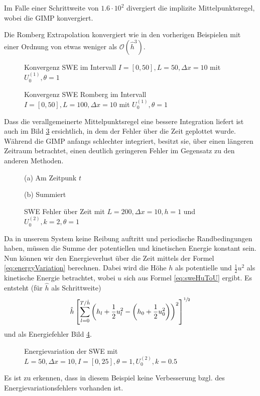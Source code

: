 Im Falle einer Schrittweite von $1.6\cdot 10^2$ divergiert die implizite Mittelpunktsregel, wobei die GIMP konvergiert. 

Die Romberg Extrapolation konvergiert wie in den vorherigen Beispielen mit einer Ordnung von etwas weniger als $\mathcal O(\hat h^3)$. 

\begin{figure}
\centering

\caption{Konvergenz SWE im Intervall $I = [0,50], L=50, \Delta x=10$ mit $U_0^{(1)},\theta=1$}
\label{fig:sweConvergence}
\end{figure}

\begin{figure}
\centering

\caption{Konvergenz SWE Romberg im Intervall $I = [0,50], L=100, \Delta x=10$ mit $U_0^{(1)},\theta=1$}
\label{fig:sweConvergenceRomberg}
\end{figure}
Dass die verallgemeinerte Mittelpunktsregel eine bessere Integration liefert ist auch im Bild \ref{fig:sweErrorOverTime} ersichtlich, in dem der Fehler über die Zeit geplottet wurde. Während die GIMP anfangs schlechter integriert, besitzt sie, über einen längeren Zeitraum betrachtet, einen deutlich geringeren Fehler im Gegensatz zu den anderen Methoden.

\begin{figure}
\footnotesize
\begin{minipage}[b]{0.49\linewidth}
\centering

\caption*{(a) Am Zeitpunk $t$}
\end{minipage}
\begin{minipage}[b]{0.49\linewidth}
\centering

\caption*{(b) Summiert}
\end{minipage}
\caption{SWE Fehler über Zeit mit $L=200,\Delta x=10,h = 1$ und $U_0^{(2)},k=2,\theta=1$}
\label{fig:sweErrorOverTime}
\end{figure}
Da in unserem System keine Reibung auftritt und periodische Randbedingungen haben, müssen die Summe der potentiellen und kinetischen Energie konstant sein. Nun können wir den Energieverlust über die Zeit mittels der Formel \eqref{eq:energyVariation} berechnen. Dabei wird die Höhe $h$ als potentielle und $\frac{1}{2}u^2$ als kinetische Energie betrachtet, wobei $u$ sich aus Formel \eqref{eq:sweHuToU} ergibt. Es entsteht (für $\hat h$ als Schrittweite)
\[
 \hat h \left[\sum_{l=0}^{T/\hat h} \left( h_l + \frac{1}{2} u_l^2 - \left(h_0 + \frac{1}{2} u_0^2\right)\right)^2\right]^{\sfrac{1}{2}}
\]
und als Energiefehler Bild \ref{fig:sweEnergyVariation}.
\begin{figure}
\centering

\caption{Energievariation der SWE mit $L=50,\Delta x = 10, I = [0,25],\theta=1,U_0^{(2)},k=0.5$}
\label{fig:sweEnergyVariation}
\end{figure}
Es ist zu erkennen, dass in diesem Beispiel keine Verbesserung bzgl. des Energievariationsfehlers vorhanden ist.
